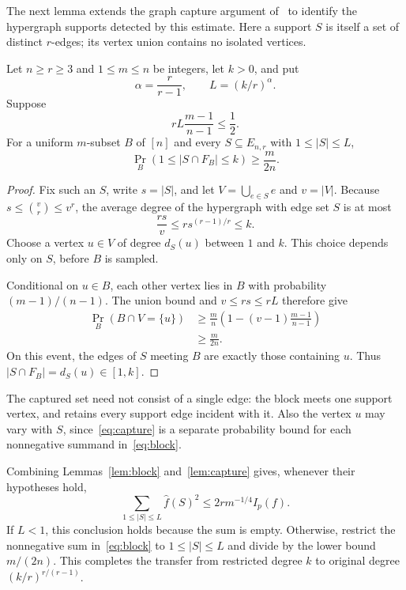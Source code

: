 The next lemma extends the graph capture argument
of~\cite[Lemma~3.3]{Graph2026} to identify the hypergraph supports
detected by this estimate. Here a support $S$ is itself a set of distinct $r$-edges;
its vertex union contains no isolated vertices.

\begin{lemma}\label{lem:capture}
Let $n\ge r\ge3$ and $1\le m\le n$ be integers, let $k>0$, and put
\[
 \alpha=\frac r{r-1},\qquad L=(k/r)^\alpha.
\]
Suppose
\begin{equation}\label{eq:capture-condition}
 rL\frac{m-1}{n-1}\le\frac12.
\end{equation}
For a uniform $m$-subset $B$ of $[n]$ and every
$S\subseteq E_{n,r}$ with $1\le|S|\le L$,
\begin{equation}\label{eq:capture}
 \Pr_B(1\le|S\cap F_B|\le k)\ge\frac{m}{2n}.
\end{equation}
\end{lemma}

\begin{proof}
Fix such an $S$, write $s=|S|$, and let $V=\bigcup_{e\in S}e$
and $v=|V|$. Because $s\le\binom vr\le v^r$, the average degree
of the hypergraph with edge set $S$ is at most
\[
 \frac{rs}{v}\le r s^{(r-1)/r}\le k.
\]
Choose a vertex $u\in V$ of degree $d_S(u)$ between $1$ and $k$.
This choice depends only on $S$, before $B$ is sampled.

Conditional on $u\in B$, each other vertex lies in $B$ with
probability $(m-1)/(n-1)$. The union bound and $v\le rs\le rL$
therefore give
\begin{align*}
 \Pr_B(B\cap V=\{u\})
 &\ge\frac mn\left(1-(v-1)\frac{m-1}{n-1}\right)\\
 &\ge\frac m{2n}.
\end{align*}
On this event, the edges of $S$ meeting $B$ are exactly those
containing $u$. Thus $|S\cap F_B|=d_S(u)\in[1,k]$.
\end{proof}

The captured set need not consist of a single edge: the block meets
one support vertex, and retains every support edge incident with it.
Also the vertex $u$ may vary with $S$, since~\eqref{eq:capture}
is a separate probability bound for each nonnegative summand
in~\eqref{eq:block}.

Combining Lemmas~\ref{lem:block} and~\ref{lem:capture} gives,
whenever their hypotheses hold,
\begin{equation}\label{eq:captured-mass}
 \sum_{1\le|S|\le L}\widehat f(S)^2
 \le 2r m^{-1/4}I_p(f).
\end{equation}
If $L<1$, this conclusion holds because the sum is empty.
Otherwise, restrict the nonnegative sum in~\eqref{eq:block} to
$1\le|S|\le L$ and divide by the lower bound $m/(2n)$.
This completes the transfer from restricted degree $k$ to original
degree $(k/r)^{r/(r-1)}$.
